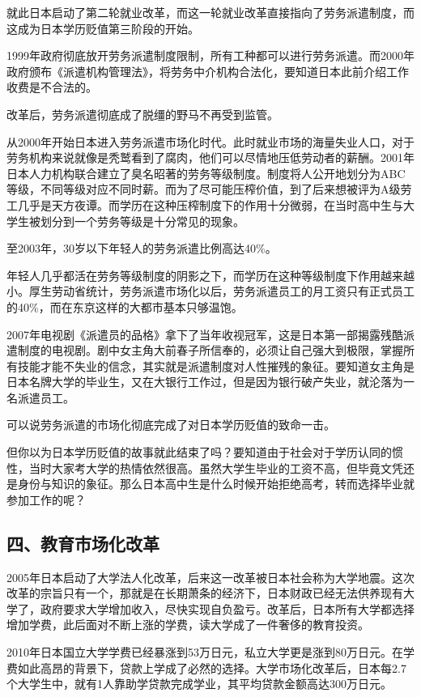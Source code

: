 就此日本启动了第二轮就业改革，而这一轮就业改革直接指向了劳务派遣制度，而这成为日本学历贬值第三阶段的开始。

1999年政府彻底放开劳务派遣制度限制，所有工种都可以进行劳务派遣。而2000年政府颁布《派遣机构管理法》，将劳务中介机构合法化，要知道日本此前介绍工作收费是不合法的。

改革后，劳务派遣彻底成了脱缰的野马不再受到监管。

从2000年开始日本进入劳务派遣市场化时代。此时就业市场的海量失业人口，对于劳务机构来说就像是秃鹫看到了腐肉，他们可以尽情地压低劳动者的薪酬。2001年日本人力机构联合建立了臭名昭著的劳务等级制度。制度将人公开地划分为ABC等级，不同等级对应不同时薪。而为了尽可能压榨价值，到了后来想被评为A级劳工几乎是天方夜谭。而学历在这种压榨制度下的作用十分微弱，在当时高中生与大学生被划分到一个劳务等级是十分常见的现象。

至2003年，30岁以下年轻人的劳务派遣比例高达40\%。

年轻人几乎都活在劳务等级制度的阴影之下，而学历在这种等级制度下作用越来越小。厚生劳动省统计，劳务派遣市场化以后，劳务派遣员工的月工资只有正式员工的40\%，而在东京这样的大都市基本只够温饱。

2007年电视剧《派遣员的品格》拿下了当年收视冠军，这是日本第一部揭露残酷派遣制度的电视剧。剧中女主角大前春子所信奉的，必须让自己强大到极限，掌握所有技能才能不失业的信念，其实就是派遣制度对人性摧残的象征。要知道女主角是日本名牌大学的毕业生，又在大银行工作过，但是因为银行破产失业，就沦落为一名派遣员工。

可以说劳务派遣的市场化彻底完成了对日本学历贬值的致命一击。

但你以为日本学历贬值的故事就此结束了吗？要知道由于社会对于学历认同的惯性，当时大家考大学的热情依然很高。虽然大学生毕业的工资不高，但毕竟文凭还是身份与知识的象征。那么日本高中生是什么时候开始拒绝高考，转而选择毕业就参加工作的呢？

\subsection{四、教育市场化改革}

2005年日本启动了大学法人化改革，后来这一改革被日本社会称为大学地震。这次改革的宗旨只有一个，那就是在长期萧条的经济下，日本财政已经无法供养现有大学了，政府要求大学增加收入，尽快实现自负盈亏。改革后，日本所有大学都选择增加学费，此后面对不断上涨的学费，读大学成了一件奢侈的教育投资。

2010年日本国立大学学费已经暴涨到53万日元，私立大学更是涨到80万日元。在学费如此高昂的背景下，贷款上学成了必然的选择。大学市场化改革后，日本每2.7个大学生中，就有1人靠助学贷款完成学业，其平均贷款金额高达300万日元。

